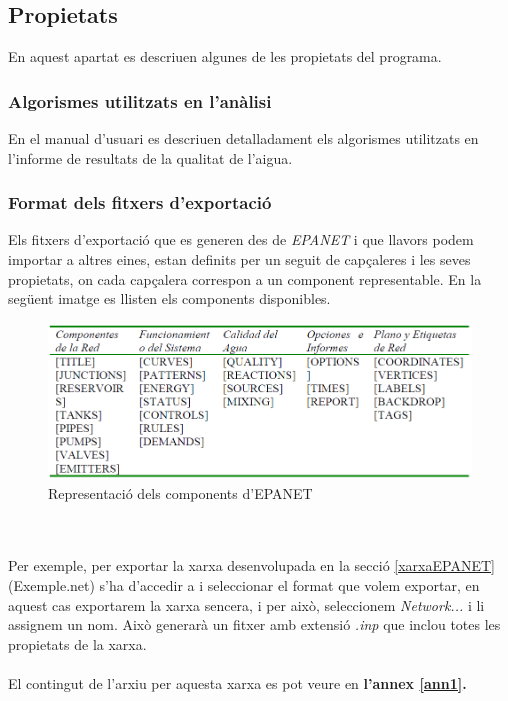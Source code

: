 \documentclass[12pt]{article}
\begin{document}
\clearpage
\subsection{Propietats}
En aquest apartat es descriuen algunes de les propietats del programa.

\subsubsection{Algorismes utilitzats en l'anàlisi}
En el manual d'usuari\cite{DocuEpanet} es descriuen detalladament els algorismes utilitzats en l'informe de resultats de la qualitat de l'aigua.

\subsubsection{Format dels fitxers d'exportació}
Els fitxers d'exportació que es generen des de \textit{EPANET} i que llavors podem importar a altres eines, estan definits per un seguit de capçaleres i les seves propietats, on cada capçalera correspon a un component representable. En la següent imatge es llisten els components disponibles.
\begin{figure}[h!]
	\centering
	\includegraphics[scale=.5]{imatges/epanet/components.png}
	\caption{Representació dels components d'EPANET}
\end{figure}
\\\\Per exemple, per exportar la xarxa desenvolupada en la secció \ref{xarxaEPANET} (Exemple.net) s'ha d'accedir a  i seleccionar el format que volem exportar, en aquest cas exportarem la xarxa sencera, i per això, seleccionem \textit{Network...} i li assignem un nom. Això generarà un fitxer amb extensió \textit{.inp} que inclou totes les propietats de la xarxa.
\\\\El contingut de l'arxiu per aquesta xarxa es pot veure en \textbf{l'annex \ref{ann1}.}
\end{document}
